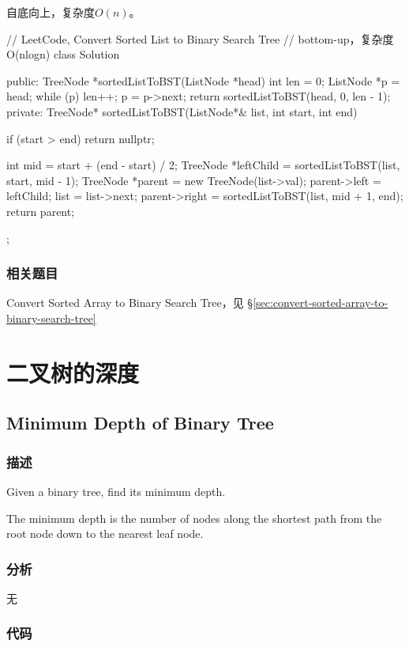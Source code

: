 自底向上，复杂度$O(n)$。
\begin{Code}
// LeetCode, Convert Sorted List to Binary Search Tree
// bottom-up，复杂度O(nlogn)
class Solution {
public:
    TreeNode *sortedListToBST(ListNode *head) {
        int len = 0;
        ListNode *p = head;
        while (p) {
            len++;
            p = p->next;
        }
        return sortedListToBST(head, 0, len - 1);
    }
private:
    TreeNode* sortedListToBST(ListNode*& list, int start, int end) {
        if (start > end) return nullptr;

        int mid = start + (end - start) / 2;
        TreeNode *leftChild = sortedListToBST(list, start, mid - 1);
        TreeNode *parent = new TreeNode(list->val);
        parent->left = leftChild;
        list = list->next;
        parent->right = sortedListToBST(list, mid + 1, end);
        return parent;
    }
};
\end{Code}


\subsubsection{相关题目}
\begindot
\item Convert Sorted Array to Binary Search Tree，见 \S \ref{sec:convert-sorted-array-to-binary-search-tree}
\myenddot


\section{二叉树的深度} %


\subsection{Minimum Depth of Binary Tree}
\label{sec:minimum-depth-of-binary-tree}


\subsubsection{描述}
Given a binary tree, find its minimum depth.

The minimum depth is the number of nodes along the shortest path from the root node down to the nearest leaf node.


\subsubsection{分析}
无

\subsubsection{代码}

